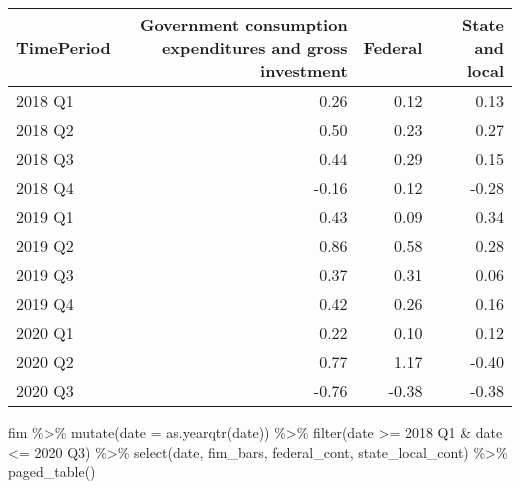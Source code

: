 \documentclass[
]{article}
\newenvironment{Shaded}{\begin{snugshade}}{\end{snugshade}}
\newcommand{\AttributeTok}[1]{\textcolor[rgb]{0.77,0.63,0.00}{#1}}
\newcommand{\FunctionTok}[1]{\textcolor[rgb]{0.00,0.00,0.00}{#1}}
\newcommand{\NormalTok}[1]{#1}
\newcommand{\SpecialCharTok}[1]{\textcolor[rgb]{0.00,0.00,0.00}{#1}}
\newcommand{\StringTok}[1]{\textcolor[rgb]{0.31,0.60,0.02}{#1}}
\begin{document}
\begin{tabular}{l|r|r|r}
\hline
TimePeriod & Government consumption expenditures and gross investment & Federal & State and local\\
\hline
2018 Q1 & 0.26 & 0.12 & 0.13\\
\hline
2018 Q2 & 0.50 & 0.23 & 0.27\\
\hline
2018 Q3 & 0.44 & 0.29 & 0.15\\
\hline
2018 Q4 & -0.16 & 0.12 & -0.28\\
\hline
2019 Q1 & 0.43 & 0.09 & 0.34\\
\hline
2019 Q2 & 0.86 & 0.58 & 0.28\\
\hline
2019 Q3 & 0.37 & 0.31 & 0.06\\
\hline
2019 Q4 & 0.42 & 0.26 & 0.16\\
\hline
2020 Q1 & 0.22 & 0.10 & 0.12\\
\hline
2020 Q2 & 0.77 & 1.17 & -0.40\\
\hline
2020 Q3 & -0.76 & -0.38 & -0.38\\
\hline
\end{tabular}

\begin{Shaded}
\begin{Highlighting}[]
\NormalTok{fim }\SpecialCharTok{\%\textgreater{}\%}
  \FunctionTok{mutate}\NormalTok{(}\AttributeTok{date =} \FunctionTok{as.yearqtr}\NormalTok{(date)) }\SpecialCharTok{\%\textgreater{}\%}
  \FunctionTok{filter}\NormalTok{(date }\SpecialCharTok{\textgreater{}=} \StringTok{\textquotesingle{}2018 Q1\textquotesingle{}} \SpecialCharTok{\&}\NormalTok{ date }\SpecialCharTok{\textless{}=} \StringTok{\textquotesingle{}2020 Q3\textquotesingle{}}\NormalTok{) }\SpecialCharTok{\%\textgreater{}\%}
  \FunctionTok{select}\NormalTok{(date, fim\_bars, federal\_cont, state\_local\_cont) }\SpecialCharTok{\%\textgreater{}\%}
  \FunctionTok{paged\_table}\NormalTok{()}
\end{Highlighting}
\end{Shaded}
\end{document}
